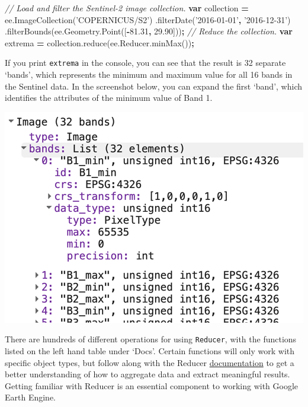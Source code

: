 \documentclass[
]{article}
\newenvironment{Shaded}{\begin{snugshade}}{\end{snugshade}}
\newcommand{\AttributeTok}[1]{\textcolor[rgb]{0.77,0.63,0.00}{#1}}
\newcommand{\CommentTok}[1]{\textcolor[rgb]{0.56,0.35,0.01}{\textit{#1}}}
\newcommand{\FloatTok}[1]{\textcolor[rgb]{0.00,0.00,0.81}{#1}}
\newcommand{\KeywordTok}[1]{\textcolor[rgb]{0.13,0.29,0.53}{\textbf{#1}}}
\newcommand{\NormalTok}[1]{#1}
\newcommand{\OperatorTok}[1]{\textcolor[rgb]{0.81,0.36,0.00}{\textbf{#1}}}
\newcommand{\StringTok}[1]{\textcolor[rgb]{0.31,0.60,0.02}{#1}}
\newcommand{\VariableTok}[1]{\textcolor[rgb]{0.00,0.00,0.00}{#1}}
\begin{document}
\begin{Shaded}
\begin{Highlighting}[]
\CommentTok{// Load and filter the Sentinel-2 image collection.}
\KeywordTok{var}\NormalTok{ collection }\OperatorTok{=} \VariableTok{ee}\NormalTok{.}\AttributeTok{ImageCollection}\NormalTok{(}\StringTok{'COPERNICUS/S2'}\NormalTok{)}
\NormalTok{    .}\AttributeTok{filterDate}\NormalTok{(}\StringTok{'2016-01-01'}\OperatorTok{,} \StringTok{'2016-12-31'}\NormalTok{)}
\NormalTok{    .}\AttributeTok{filterBounds}\NormalTok{(}\VariableTok{ee}\NormalTok{.}\VariableTok{Geometry}\NormalTok{.}\AttributeTok{Point}\NormalTok{([}\OperatorTok{-}\FloatTok{81.31}\OperatorTok{,} \FloatTok{29.90}\NormalTok{]))}\OperatorTok{;}
\CommentTok{// Reduce the collection.}
\KeywordTok{var}\NormalTok{ extrema }\OperatorTok{=} \VariableTok{collection}\NormalTok{.}\AttributeTok{reduce}\NormalTok{(}\VariableTok{ee}\NormalTok{.}\VariableTok{Reducer}\NormalTok{.}\AttributeTok{minMax}\NormalTok{())}\OperatorTok{;}
\end{Highlighting}
\end{Shaded}

If you print \texttt{extrema} in the console, you can see that the result is 32 separate `bands', which represents the minimum and maximum value for all 16 bands in the Sentinel data. In the screenshot below, you can expand the first `band', which identifies the attributes of the minimum value of Band 1.

\begin{center}\includegraphics[width=0.5\linewidth]{im3} \end{center}

There are hundreds of different operations for using \texttt{Reducer}, with the functions listed on the left hand table under `Docs'. Certain functions will only work with specific object types, but follow along with the Reducer \href{https://developers.google.com/earth-engine/guides/reducers_intro}{documentation} to get a better understanding of how to aggregate data and extract meaningful results. Getting familiar with Reducer is an essential component to working with Google Earth Engine.
\end{document}
